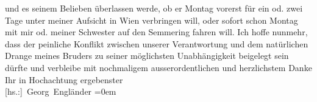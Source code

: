 \begin{ledgroupsized}[t]{13cm}
                    und es seinem Belieben überlassen werde, ob er Montag vorerst für
                    ein od. zwei Tage unter meiner Aufsicht in Wien
                    verbringen will, oder sofort schon Montag mit mir od. meiner Schwester auf den Semmering fahren will.\pend
           \pstart
           Ich hoffe nunmehr, dass der peinliche Konflikt zwischen unserer Verantwortung und
                    dem natürlichen Drange meines Bruders zu seiner möglichsten Unabhängigkeit beigelegt sein dürfte und
                    verbleibe mit nochmaligem ausserordentlichen und herzlichstem Danke Ihr in\pend
           \pstart
           Hochachtung ergebenster{\\[\baselineskip]}\spacefill\mbox{{[}hs.:{]} Georg
                    Engländer}\pend
           \leftskip=0em{}          \endnumbering{}\end{ledgroupsized}  \newcommand{\dateiname}{L02131}\newcommand{\titel}{Georg Engländer an Arthur Schnitzler, 25. 4. 1913}\newcommand{\editorInnen}{Martin Anton Müller und Gerd-Hermann Susen}
      